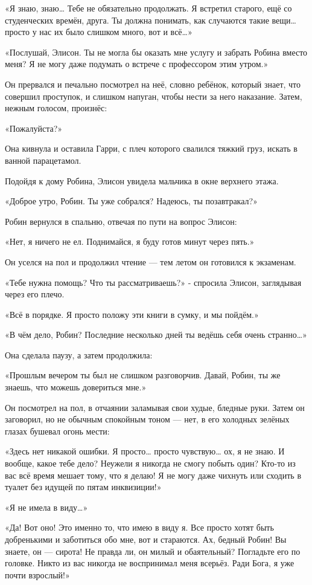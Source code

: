 \documentclass[a5paper, 9pt,
final, openany, twoside=true]{memoir}
\begin{document}
«Я знаю, знаю… Тебе не обязательно продолжать. Я встретил старого, ещё со студенческих времён, друга. Ты должна понимать, как случаются такие вещи… просто у нас их было слишком много, вот и всё…»

«Послушай, Элисон. Ты не могла бы оказать мне услугу и забрать Робина вместо меня? Я не могу даже подумать о встрече с профессором этим утром.»

Он прервался и печально посмотрел на неё, словно ребёнок, который знает, что совершил проступок, и слишком напуган, чтобы нести за него наказание. Затем, нежным голосом, произнёс:

«Пожалуйста?»

Она кивнула и оставила Гарри, с плеч которого свалился тяжкий груз, искать в ванной парацетамол.\bigskip

Подойдя к дому Робина, Элисон увидела мальчика в окне верхнего этажа.

«Доброе утро, Робин. Ты уже собрался? Надеюсь, ты позавтракал?»

Робин вернулся в спальню, отвечая по пути на вопрос Элисон:

«Нет, я ничего не ел. Поднимайся, я буду готов минут через пять.»

Он уселся на пол и продолжил чтение — тем летом он готовился к экзаменам.

«Тебе нужна помощь? Что ты рассматриваешь?» - спросила Элисон, заглядывая через его плечо.

«Всё в порядке. Я просто положу эти книги в сумку, и мы пойдём.»

«В чём дело, Робин? Последние несколько дней ты ведёшь себя очень странно…»

Она сделала паузу, а затем продолжила:

«Прошлым вечером ты был не слишком разговорчив. Давай, Робин, ты же знаешь, что можешь довериться мне.»

Он посмотрел на пол, в отчаянии заламывая свои худые, бледные руки. Затем он заговорил, но не обычным спокойным тоном — нет, в его холодных зелёных глазах бушевал огонь мести:

«Здесь нет никакой ошибки. Я просто… просто чувствую… ох, я не знаю. И вообще, какое тебе дело? Неужели я никогда не смогу побыть один? Кто-то из вас всё время мешает тому, что я делаю! Я не могу даже чихнуть или сходить в туалет без идущей по пятам инквизиции!»

«Я не имела в виду…»

«Да! Вот оно! Это именно то, что имею в виду я. Все просто хотят быть добренькими и заботиться обо мне, вот и стараются. Ах, бедный Робин! Вы знаете, он — сирота! Не правда ли, он милый и обаятельный? Погладьте его по головке. Никто из вас никогда не воспринимал меня всерьёз. Ради Бога, я уже почти взрослый!»
\end{document}
